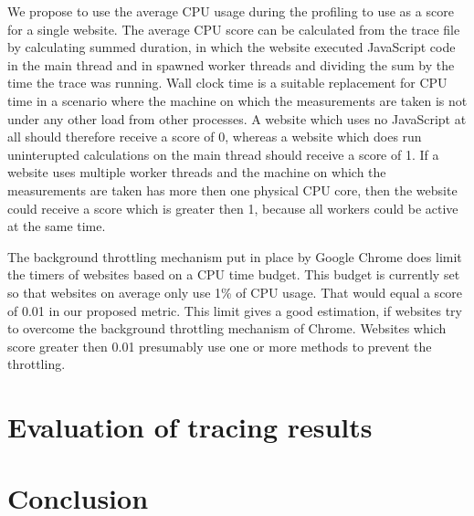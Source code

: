 \documentclass[article,type=bsc,colorback,accentcolor=tud9c]{tudthesis}
\begin{document}
  We propose to use the average CPU usage during the profiling to use as a score for a single website. The average CPU score can be calculated from the trace file by calculating summed duration, in which the website executed JavaScript code in the main thread and in spawned worker threads and dividing the sum by the time the trace was running. Wall clock time is a suitable replacement for CPU time in a scenario where the machine on which the measurements are taken is not under any other load from other processes. A website which uses no JavaScript at all should therefore receive a score of 0, whereas a website which does run uninterupted calculations on the main thread should receive a score of 1. If a website uses multiple worker threads and the machine on which the measurements are taken has more then one physical CPU core, then the website could receive a score which is greater then 1, because all workers could be active at the same time.

  The background throttling mechanism put in place by Google Chrome does limit the timers of websites based on a CPU time budget. This budget is currently set so that websites on average only use 1\% of CPU usage. That would equal a score of 0.01 in our proposed metric. This limit gives a good estimation, if websites try to overcome the background throttling mechanism of Chrome. Websites which score greater then 0.01 presumably use one or more methods to prevent the throttling.

  


  
  \newpage
  \section{Evaluation of tracing results}
  
  \newpage
  \section{Conclusion}

  
  \newpage
  \printbibliography[heading=bibnumbered]

   
\end{document}
